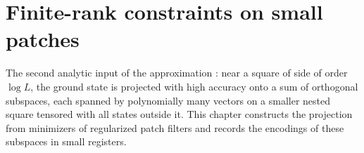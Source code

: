 \chapter{Finite-rank constraints on small patches}
\label{ch:peps_angular_patches}

The second analytic input of the approximation
\cite[Section~4]{OpenAI2026PolynomialPEPS}: near a square of side of order
$\log L$, the ground state is projected with high accuracy onto a sum of
orthogonal subspaces, each spanned by polynomially many vectors on a smaller
nested square tensored with all states outside it. This chapter constructs the
projection from minimizers of regularized patch filters and records the
encodings of these subspaces in small registers.

















